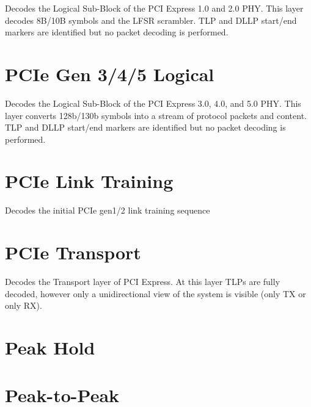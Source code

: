 Decodes the Logical Sub-Block of the PCI Express 1.0 and 2.0 PHY. This layer decodes 8B/10B symbols and the LFSR
scrambler. TLP and DLLP start/end markers are identified but no packet decoding is performed.

\pagebreak
\section{PCIe Gen 3/4/5 Logical}

Decodes the Logical Sub-Block of the PCI Express 3.0, 4.0, and 5.0 PHY. This layer converts 128b/130b symbols into a
stream of protocol packets and content. TLP and DLLP start/end markers are identified but no packet decoding is
performed.

\pagebreak
\section{PCIe Link Training}

Decodes the initial PCIe gen1/2 link training sequence

\pagebreak
\section{PCIe Transport}

Decodes the Transport layer of PCI Express. At this layer TLPs are fully decoded, however only a unidirectional view
of the system is visible (only TX or only RX).

\pagebreak
\section{Peak Hold}

\pagebreak
\section{Peak-to-Peak}

